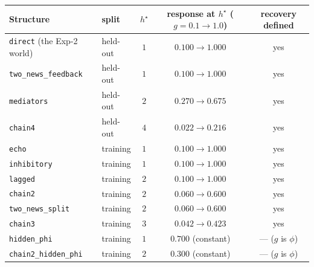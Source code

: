 \begin{center}
\begin{minipage}{\linewidth}
\centering
{}
\label{tab:exp3-worlds}
\footnotesize
\begin{tabular}{l l c c c}
\toprule
Structure & split & $h^\star$ & response at $h^\star$ ($g{=}0.1\to1.0$) & recovery defined \\
\midrule
\texttt{direct} (the Exp-2 world) & held-out & $1$ & $0.100 \to 1.000$ & yes \\
\texttt{two\_news\_feedback}      & held-out & $1$ & $0.100 \to 1.000$ & yes \\
\texttt{mediators}                & held-out & $2$ & $0.270 \to 0.675$ & yes \\
\texttt{chain4}                   & held-out & $4$ & $0.022 \to 0.216$ & yes \\
\midrule
\texttt{echo}                     & training & $1$ & $0.100 \to 1.000$ & yes \\
\texttt{inhibitory}               & training & $1$ & $0.100 \to 1.000$ & yes \\
\texttt{lagged}                   & training & $2$ & $0.100 \to 1.000$ & yes \\
\texttt{chain2}                   & training & $2$ & $0.060 \to 0.600$ & yes \\
\texttt{two\_news\_split}         & training & $2$ & $0.060 \to 0.600$ & yes \\
\texttt{chain3}                   & training & $3$ & $0.042 \to 0.423$ & yes \\
\texttt{hidden\_phi}              & training & $1$ & $0.700$ (constant)  & --- ($g$ is $\phi$) \\
\texttt{chain2\_hidden\_phi}      & training & $2$ & $0.300$ (constant)  & --- ($g$ is $\phi$) \\
\bottomrule
\end{tabular}
\end{minipage}
\end{center}

